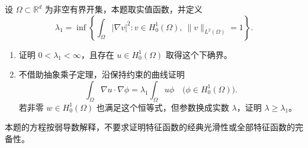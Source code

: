 \begin{optionalexercise}\label{b1:ex:25-first-dirichlet-eigenvalue}
设 \(\Omega\subset\mathbb R^d\) 为非空有界开集，本题取实值函数，并定义
\[
 \lambda_1=\inf\left\{
       \int_\Omega|\nabla v|^2:
       v\in H_0^1(\Omega),\ \|v\|_{L^2(\Omega)}=1
                    \right\}.
\]
\begin{enumerate}
 \item\label{b1:item:25-first-eigenvalue-attainment}
 证明 \(0<\lambda_1<\infty\)，且存在 \(u\in H_0^1(\Omega)\) 取得这个下确界。
 \item\label{b1:item:25-first-eigenvalue-equation}
 不借助抽象乘子定理，沿保持约束的曲线证明
 \[
  \int_\Omega\nabla u\cdot\nabla\phi
       =\lambda_1\int_\Omega u\phi
              \quad\bigl(\phi\in H_0^1(\Omega)\bigr).
 \]
 若非零 \(w\in H_0^1(\Omega)\) 也满足这个恒等式，但参数换成实数
 \(\lambda\)，证明 \(\lambda\ge\lambda_1\)。
\end{enumerate}
本题的方程按弱导数解释，不要求证明特征函数的经典光滑性或全部特征函数的完备性。
\end{optionalexercise}
